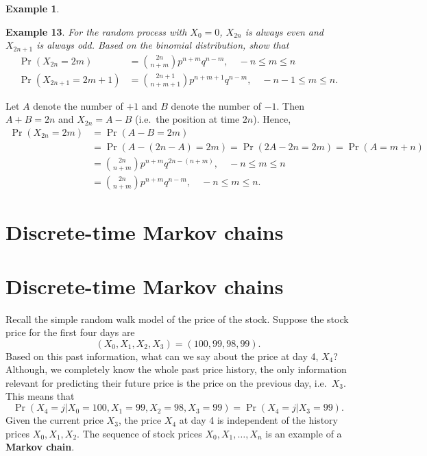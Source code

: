\documentclass[
]{book}
\theoremstyle{definition}
\theoremstyle{definition}
\newtheorem{example}{Example}[chapter]
\theoremstyle{definition}
\theoremstyle{definition}
\theoremstyle{remark}
\begin{document}
\begin{example}
\protect\hypertarget{exm:unlabeled-div-13}{}\label{exm:unlabeled-div-13}

\textbf{Example 13}. \emph{For the random process with \(X_0 = 0\), \(X_{2n}\) is
always even and \(X_{2n+1}\) is always odd. Based on the binomial
distribution, show that \[\begin{aligned}
    \Pr(X_{2n} = 2m) &= {2n \choose n+m} p^{n+m} q^{n-m}, \quad   -n \le m \le n \\
    \Pr(X_{2n+1} = 2m+1) &= {2n + 1 \choose n+m+1} p^{n+m+1} q^{n-m}, \quad   -n-1 \le m \le n.\end{aligned}\]}

\end{example}

Let \(A\) denote the number of \(+1\) and \(B\) denote the number of \(-1\).
Then \(A + B = 2n\) and \(X_{2n} = A - B\) (i.e.~the position at time \(2n\)).
Hence, \[\begin{aligned}
    \Pr(X_{2n} = 2m) &= \Pr( A - B = 2m) \\
    &= \Pr( A - (2n - A) = 2m)  =   \Pr( 2A - 2n  = 2m) =   \Pr( A   = m + n)\\
    &= {2n \choose n+m} p^{n+m} q^{2n-(n+m)}, \quad   -n \le m \le n \\
    &= {2n \choose n+m} p^{n+m} q^{n-m}, \quad   -n \le m \le n.\end{aligned}\]

\hypertarget{discrete-time-markov-chains}{%
\chapter{Discrete-time Markov chains}\label{discrete-time-markov-chains}}

\hypertarget{discrete-time-markov-chains-1}{%
\chapter{Discrete-time Markov chains}\label{discrete-time-markov-chains-1}}

Recall the simple random walk model of the price of the stock. Suppose
the stock price for the first four days are
\[(X_0, X_1, X_2, X_3) = (100, 99, 98, 99).\] Based on this past
information, what can we say about the price at day 4, \(X_4\)? Although,
we completely know the whole past price history, the only information
relevant for predicting their future price is the price on the previous
day, i.e.~\(X_3\). This means that
\[\Pr(X_{4} = j | X_0 = 100, X_{1} = 99,  X_2 = 98 ,  X_3 = 99) = \Pr(X_{4} = j | X_3 = 99).\]
Given the current price \(X_3\), the price \(X_4\) at day 4 is independent
of the history prices \(X_0, X_1, X_2\). The sequence of stock prices
\(X_0, X_1, \ldots, X_n\) is an example of a \textbf{Markov chain}.
\end{document}
